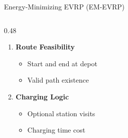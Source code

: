 \documentclass[aspectratio=169,11pt]{beamer}
\begin{document}
\begin{frame}{Energy-Minimizing EVRP (EM-EVRP)}
\begin{columns}[T]
\begin{column}{0.48\textwidth}
\begin{enumerate}
                \item \textbf{Route Feasibility}
                \begin{itemize}
                    \item Start and end at depot
                    \item Valid path existence
                \end{itemize}
                
                \item \textbf{Charging Logic}
                \begin{itemize}
                    \item Optional station visits
                    \item Charging time cost
                \end{itemize}
            \end{enumerate}
        \end{column}
    \end{columns}
\end{frame}
\end{document}
